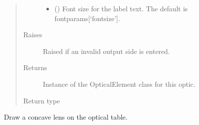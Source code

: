 \documentclass[letterpaper,10pt,english]{sphinxmanual}
\begin{document}
\begin{fulllineitems}
\begin{fulllineitems}
\begin{quote}
\begin{description}
\begin{itemize}
\item {} 
\sphinxAtStartPar
{} (\sphinxstyleliteralemphasis{\sphinxupquote{, }}) \textendash{} Font size for the label text. The default is fontparams{[}‘fontsize’{]}.

\end{itemize}

\item[{Raises}] \leavevmode
\sphinxAtStartPar
{} \textendash{} Raised if an invalid output side is entered.

\item[{Returns}] \leavevmode
\sphinxAtStartPar
Instance of the OpticalElement class for this optic.

\item[{Return type}] \leavevmode
\sphinxAtStartPar
{\hyperref[\detokenize{index:pyopticaltable.OpticalElement}]{}}

\end{description}\end{quote}

\end{fulllineitems}


\begin{fulllineitems}
\label{\detokenize{index:pyopticaltable.OpticalTable.concave_lens}}
\sphinxAtStartPar
Draw a concave lens on the optical table.


\end{fulllineitems}
\end{fulllineitems}
\end{document}
